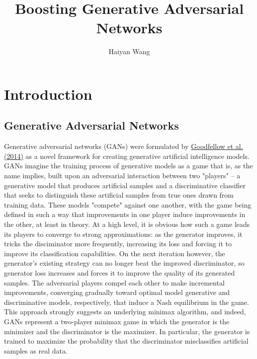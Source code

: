 \documentclass[submission]{eptcs}
\title{Boosting Generative Adversarial Networks}
\author{Haiyan Wang
\institute{Duke University}
\email{haiyan.wang916@duke.edu}}
\begin{document}
\maketitle


\section{Introduction}

\subsection{Generative Adversarial Networks}

Generative adversarial networks (GANs) were formulated by \href{https://arxiv.org/pdf/1406.2661.pdf}{Goodfellow et al. (2014)} as a novel framework for creating generative artificial intelligence models. GANs imagine the training process of generative models as a game that is, as the name implies, built upon an adversarial interaction between two "players" -- a generative model that produces artificial samples and a discriminative classifier that seeks to distinguish these artificial samples from true ones drawn from training data. These models "compete" against one another, with the game being defined in such a way that improvements in one player induce improvements in the other, at least in theory. At a high level, it is obvious how such a game leads its players to converge to strong approximations: as the generator improves, it tricks the disciminator more frequently, increasing its loss and forcing it to improve its classification capabilities. On the next iteration however, the generator's existing strategy can no longer beat the improved discriminator, so generator loss increases and forces it to improve the quality of its generated samples. The adversarial players compel each other to make incremental improvements, converging gradually toward optimal model generative and discriminative models, respectively, that induce a Nash equilibrium in the game. This approach strongly suggests an underlying minimax algorithm, and indeed, GANs represent a two-player minimax game in which the generator is the minimizer and the discriminator is the maximizer. In particular, the generator is trained to maximize the probability that the discriminator misclassifies artificial samples as real data. \\
\end{document}
